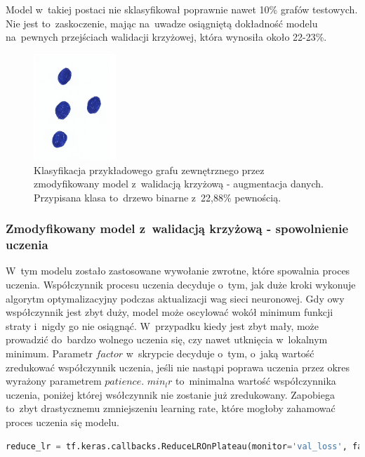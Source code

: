 Model w~takiej postaci nie sklasyfikował poprawnie nawet 10\% grafów testowych.
Nie jest to~zaskoczenie, mając na~uwadze osiągniętą dokładność modelu na~pewnych przejściach walidacji krzyżowej,
która wynosiła około 22-23\%.

\begin{figure}[ht]
	\centering
	\includegraphics[height=4cm]{../graph_classification/test_graphs/drawn/empty-8.png}
	\caption{Klasyfikacja przykładowego grafu zewnętrznego przez zmodyfikowany model z~walidacją krzyżową - augmentacja danych.
		Przypisana klasa to~drzewo binarne z~22,88\% pewnością.}
	\label{Fig:tests-cv-3d}
\end{figure}
\FloatBarrier

\subsubsection{Zmodyfikowany model z~walidacją krzyżową - spowolnienie uczenia}

W~tym modelu zostało zastosowane wywołanie zwrotne, które spowalnia proces uczenia.
Współczynnik procesu uczenia decyduje o~tym, jak duże kroki wykonuje algorytm optymalizacyjny podczas aktualizacji wag sieci neuronowej.
Gdy owy współczynnik jest zbyt duży, model może oscylować wokół minimum funkcji straty i~nigdy go nie osiągnąć.
W~przypadku kiedy jest zbyt mały, może prowadzić do~bardzo wolnego uczenia się, czy nawet utknięcia w~lokalnym minimum.
Parametr $factor$ w~skrypcie decyduje o~tym, o~jaką wartość zredukować współczynnik uczenia,
jeśli nie nastąpi poprawa uczenia przez okres wyrażony parametrem $patience$.
$min_lr$ to~minimalna wartość współczynnika uczenia, poniżej której wsółczynnik nie zostanie już zredukowany.
Zapobiega to~zbyt drastycznemu zmniejszeniu learning rate, które mogłoby zahamować proces uczenia się modelu.

\begin{lstlisting}[language=Python,caption=Listing zmodyfikowanego skryptu
	znajdującego się bezpośrdenio po~tworzeniu modelu z~walidacją krzyżową - wersja 4,label={tests-model-crossval4}]
	reduce_lr = tf.keras.callbacks.ReduceLROnPlateau(monitor='val_loss', factor=0.2, patience=5, min_lr=0.001)
\end{lstlisting}

